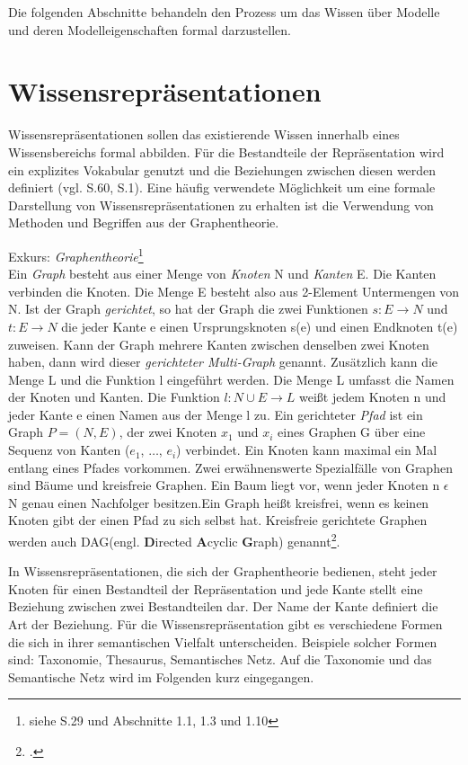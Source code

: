 Die folgenden Abschnitte behandeln den Prozess um das Wissen über Modelle und deren Modelleigenschaften formal darzustellen.
\section{Wissensrepräsentationen}
\label{Ch:Vorbetrachtung:Sec:Wissensrepräsentaionen}
Wissensrepräsentationen sollen das existierende Wissen innerhalb eines Wissensbereichs formal abbilden. Für die Bestandteile der Repräsentation wird ein explizites Vokabular genutzt und die Beziehungen zwischen diesen werden definiert (vgl. \cite{BEN16} S.60, \cite{SEB04} S.1). Eine häufig verwendete Möglichkeit um eine formale Darstellung von Wissensrepräsentationen zu erhalten ist die Verwendung von Methoden und Begriffen aus der Graphentheorie.

Exkurs: \textit{Graphentheorie}\footnote{siehe \cite{STU09} S.29 und \cite{DIE20} Abschnitte 1.1, 1.3 und 1.10}\\
Ein \textit{Graph} besteht aus einer Menge von \textit{Knoten} N und \textit{Kanten} E. Die Kanten verbinden die Knoten. Die Menge E besteht also aus 2-Element Untermengen von N. Ist der Graph \textit{gerichtet}, so hat der Graph die zwei Funktionen $s:E\rightarrow N$ und $t:E\rightarrow N$ die jeder Kante e einen Ursprungsknoten s(e) und einen Endknoten t(e) zuweisen. Kann der Graph mehrere Kanten zwischen denselben zwei Knoten haben, dann wird dieser \textit{gerichteter Multi-Graph} genannt. Zusätzlich kann die Menge L und die Funktion l eingeführt werden. Die Menge L umfasst die Namen der Knoten und Kanten. Die Funktion $l:N\cup E\rightarrow L$ weißt jedem Knoten n und jeder Kante e einen Namen aus der Menge l zu.
Ein gerichteter \textit{Pfad} ist ein Graph $P = (N, E)$, der zwei Knoten $x_1$ und $x_i$ eines Graphen G über eine Sequenz von Kanten ($e_1$, $\dots$, $e_i$) verbindet. Ein Knoten kann maximal ein Mal entlang eines Pfades vorkommen. 
Zwei erwähnenswerte Spezialfälle von Graphen sind Bäume und kreisfreie Graphen. Ein Baum liegt vor, wenn jeder Knoten n $\epsilon$ N genau einen Nachfolger besitzen.\glqq Ein Graph heißt kreisfrei, wenn es keinen Knoten gibt der einen Pfad zu sich selbst hat. Kreisfreie gerichtete Graphen werden auch DAG(engl. \textbf{D}irected \textbf{A}cyclic \textbf{G}raph) genannt\grqq\footcite{STU09}. 

In Wissensrepräsentationen, die sich der Graphentheorie bedienen, steht jeder Knoten für einen Bestandteil der Repräsentation und jede Kante stellt eine Beziehung zwischen zwei Bestandteilen dar. Der Name der Kante definiert die Art der Beziehung. Für die Wissensrepräsentation gibt es verschiedene Formen die sich in ihrer semantischen Vielfalt unterscheiden. Beispiele solcher Formen sind: Taxonomie, Thesaurus, Semantisches Netz. Auf die Taxonomie und das Semantische Netz wird im Folgenden kurz eingegangen.
 
